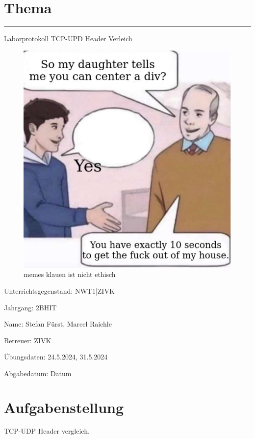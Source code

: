 \documentclass[a4paper]{article}
\begin{document}
\pagestyle{oida}
\section*{Thema}
\par\noindent\rule{\textwidth}{0.4pt}

Laborprotokoll
TCP-UPD Header Verleich

\begin{figure}[h]
	\includegraphics[scale=0.6]{images/meme.jpeg}
	\caption{memes klauen ist nicht ethisch}
\end{figure}

\vspace*{\fill}
Unterrichtsgegenstand:	NWT1|ZIVK

Jahrgang:	2BHIT

Name:	Stefan Fürst, Marcel Raichle

Betreuer: 	ZIVK

Übungsdaten:	24.5.2024, 31.5.2024

Abgabedatum:	Datum


\newpage
\tableofcontents

\newpage

\section{Aufgabenstellung}
TCP-UDP Header vergleich.
\end{document}
